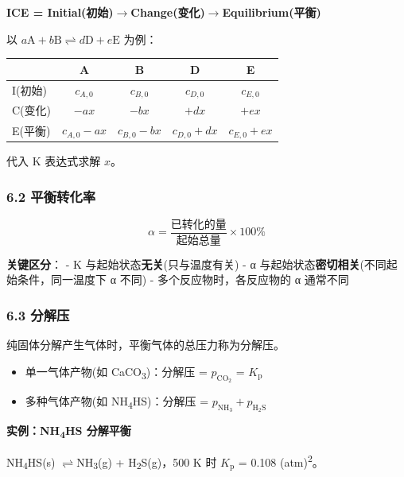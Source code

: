 \documentclass[a4paper,11pt]{ctexart}
\providecommand{\tightlist}{\setlength{\itemsep}{0pt}\setlength{\parskip}{0pt}}
\newcounter{none}
\newcommand{\箭}{\ensuremath{\rightarrow}}
\newcommand{\左箭}{\ensuremath{\leftarrow}}
\newcommand{\上箭}{\ensuremath{\uparrow}}
\newcommand{\下箭}{\ensuremath{\downarrow}}
\newcommand{\衡}{\ensuremath{\rightleftharpoons}}
\newcommand{\双箭}{\ensuremath{\leftrightarrow}}
\newcommand{\约等于}{\ensuremath{\approx}}
\newcommand{\小于等于}{\ensuremath{\leq}}
\newcommand{\大于等于}{\ensuremath{\geq}}
\newcommand{\不等于}{\ensuremath{\neq}}
\newcommand{\西格马}{\ensuremath{\sigma}}
\newcommand{\派}{\ensuremath{\pi}}
\begin{document}
\textbf{ICE = Initial(初始)\箭 Change(变化)\箭 Equilibrium(平衡)}

以 \(a\mathrm{A} + b\mathrm{B} \rightleftharpoons d\mathrm{D} + e\mathrm{E}\) 为例：

{\def\LTcaptype{none} %
\begin{longtable}[]{@{}lcccc@{}}
\toprule\noalign{}
& A & B & D & E \\
\midrule\noalign{}
\endhead
\bottomrule\noalign{}
\endlastfoot
I(初始) & \(c_{A,0}\) & \(c_{B,0}\) & \(c_{D,0}\) & \(c_{E,0}\) \\
C(变化) & \(-ax\) & \(-bx\) & \(+dx\) & \(+ex\) \\
E(平衡) & \(c_{A,0}-ax\) & \(c_{B,0}-bx\) & \(c_{D,0}+dx\) & \(c_{E,0}+ex\) \\
\end{longtable}
}

代入 K 表达式求解 \(x\)。

\subsubsection{6.2 平衡转化率}\label{ux5e73ux8861ux8f6cux5316ux7387}

\[
\alpha = \frac{\text{已转化的量}}{\text{起始总量}} \times 100\%
\]

\textbf{关键区分}：
- K 与起始状态\textbf{无关}(只与温度有关)
- α 与起始状态\textbf{密切相关}(不同起始条件，同一温度下 α 不同)
- 多个反应物时，各反应物的 α 通常不同

\subsubsection{6.3 分解压}\label{ux5206ux89e3ux538b}

纯固体分解产生气体时，平衡气体的总压力称为分解压。

\begin{itemize}
\tightlist
\item
  单一气体产物(如 CaCO\textsubscript{3})：分解压 = \(p_{\mathrm{CO_2}}\) = \(K_{\mathrm p}\)
\item
  多种气体产物(如 NH\textsubscript{4}HS)：分解压 = \(p_{\mathrm{NH_3}} + p_{\mathrm{H_2S}}\)
\end{itemize}

\textbf{实例：NH\textsubscript{4}HS 分解平衡}

NH\textsubscript{4}HS(s) \衡 NH\textsubscript{3}(g) + H\textsubscript{2}S(g)，500 K 时 \(K_{\mathrm p}\) = 0.108 (atm)\textsuperscript{2}。
\end{document}
